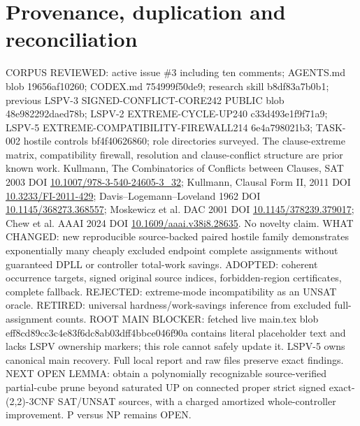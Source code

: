 \documentclass[10pt]{article}
\begin{document}
\section{Provenance, duplication and reconciliation}
CORPUS REVIEWED: active issue \#3 including ten comments; AGENTS.md blob 19656af10260; CODEX.md 754999f50de9; research skill b8df83a7b0b1; previous LSPV-3 SIGNED-CONFLICT-CORE242 PUBLIC blob 48e982292daed78b; LSPV-2 EXTREME-CYCLE-UP240 c33d493e1f9f71a9; LSPV-5 EXTREME-COMPATIBILITY-FIREWALL214 6e4a798021b3; TASK-002 hostile controls bf4f40626860; role directories surveyed. The clause-extreme matrix, compatibility firewall, resolution and clause-conflict structure are prior known work. Kullmann, The Combinatorics of Conflicts between Clauses, SAT 2003 DOI \href{https://doi.org/10.1007/978-3-540-24605-3_32}{10.1007/978-3-540-24605-3\_32}; Kullmann, Clausal Form II, 2011 DOI \href{https://doi.org/10.3233/FI-2011-429}{10.3233/FI-2011-429}; Davis--Logemann--Loveland 1962 DOI \href{https://doi.org/10.1145/368273.368557}{10.1145/368273.368557}; Moskewicz et al. DAC 2001 DOI \href{https://doi.org/10.1145/378239.379017}{10.1145/378239.379017}; Chew et al. AAAI 2024 DOI \href{https://doi.org/10.1609/aaai.v38i8.28635}{10.1609/aaai.v38i8.28635}. No novelty claim.
WHAT CHANGED: new reproducible source-backed paired hostile family demonstrates exponentially many cheaply excluded endpoint complete assignments without guaranteed DPLL or controller total-work savings. ADOPTED: coherent occurrence targets, signed original source indices, forbidden-region certificates, complete fallback. REJECTED: extreme-mode incompatibility as an UNSAT oracle. RETIRED: universal hardness/work-savings inference from excluded full-assignment counts.
ROOT MAIN BLOCKER: fetched live main.tex blob eff8cd89cc3c4e83f6dc8ab03dff4bbce046f90a contains literal placeholder text and lacks LSPV ownership markers; this role cannot safely update it. LSPV-5 owns canonical main recovery. Full local report and raw files preserve exact findings.
NEXT OPEN LEMMA: obtain a polynomially recognizable source-verified partial-cube prune beyond saturated UP on connected proper strict signed exact-(2,2)-3CNF SAT/UNSAT sources, with a charged amortized whole-controller improvement. P versus NP remains OPEN.
\end{document}
